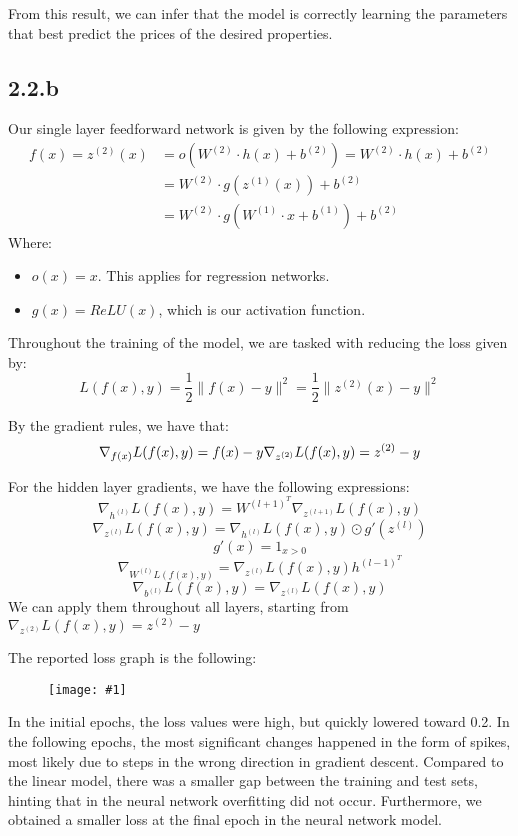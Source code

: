 \documentclass[10pt]{article}
\newcommand{\img}[1]{\begin{figure}[H]\centering\texttt{[image: \#1]}\end{figure}}
\begin{document}
From this result, we can infer that the model is correctly learning the parameters that best predict the prices of the desired properties.

\subsection{2.2.b}
Our single layer feedforward network is given by the following expression:
\begin{equation}
\begin{aligned}
f(x) = z^{(2)}(x) &= o(W^{(2)}\cdot h(x) + b^{(2)})
      = W^{(2)}\cdot h(x) + b^{(2)} \\
     &= W^{(2)}\cdot g(z^{(1)}(x)) + b^{(2)} \\
     &= W^{(2)}\cdot g(W^{(1)}\cdot x + b^{(1)}) + b^{(2)}
\end{aligned}
\end{equation}
Where:
\begin{itemize}
    \item $o(x) = x$. This applies for regression networks.
    \item $g(x) = ReLU(x)$, which is our activation function.
\end{itemize}

Throughout the training of the model, we are tasked with reducing the loss given by:
$$
L(f(x), y) = \frac{1}{2}\|f(x)-y\|^{2} = \frac{1}{2}\|z^{(2)}(x)-y\|^{2}
$$

By the gradient rules, we have that:
$$
\nabla_{f(x)}L(f(x), y) = f(x) - y \\
\nabla_{z^{(2)}}L(f(x), y) = z^{(2)} - y
$$

For the hidden layer gradients, we have the following expressions:
$$
\nabla_{h^{(l)}}L(f(x),y) = W^{(l+1)^{T}}\nabla_{z^{(l+1)}}L(f(x),y)
$$
$$
\nabla_{z^{(l)}}L(f(x),y) =
\nabla_{h^{(l)}}L(f(x),y)\odot g'(z^{(l)})
$$
$$
g'(x) = 1_{x>0}
$$
$$
\nabla_{W^{(l)}L(f(x),y)} =
\nabla_{z^{(l)}}L(f(x),y)h^{(l-1)^{T}}
$$
$$
\nabla_{b^{(l)}}L(f(x),y) =
\nabla_{z^{(l)}}L(f(x),y)
$$
We can apply them throughout all layers, starting from $\nabla_{z^{(2)}}L(f(x), y) = z^{(2)} - y$

The reported loss graph is the following:

\img{results/q2/2_b/loss_lr1e-3_150ep.png}

In the initial epochs, the loss values were high, but quickly lowered toward 0.2. In the following epochs, the most significant changes happened in the form of spikes, most likely due to steps in the wrong direction in gradient descent.
Compared to the linear model, there was a smaller gap between the training and test sets, hinting that in the neural network overfitting did not occur. Furthermore, we obtained a smaller loss at the final epoch in the neural network model.
\end{document}
